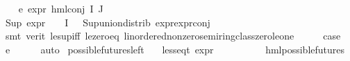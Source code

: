 \begin{isabellebody}
\ \ \isamarkupfalse%
\ e{}{\isacharcolon}{\kern0pt}\ {\isachardoublequoteopen}expr{\isacharunderscore}{\kern0pt}{}\ {\isacharparenleft}{\kern0pt}hml{\isacharunderscore}{\kern0pt}conj\ I\ J\ {\isasymPhi}{\isacharparenright}{\kern0pt}\ {\isasymle}\ {}{\isachardoublequoteclose}\isanewline
\ \ \ \ \isamarkupfalse%
\ {\isacartoucheopen}Sup\ {\isacharparenleft}{\kern0pt}{\isacharparenleft}{\kern0pt}expr{\isacharunderscore}{\kern0pt}{}\ {\isasymcirc}\ {\isasymPhi}{\isacharparenright}{\kern0pt}\ {\isacharbackquote}{\kern0pt}\ I{\isacharparenright}{\kern0pt}\ {\isasymle}\ {}{\isacartoucheclose}\ Sup{\isacharunderscore}{\kern0pt}union{\isacharunderscore}{\kern0pt}distrib\ expr{\isacharunderscore}{\kern0pt}{}{\isachardot}{\kern0pt}expr{\isacharunderscore}{\kern0pt}{}{\isacharunderscore}{\kern0pt}conj\isanewline
\ \ \ \ \isamarkupfalse%
\ {\isacharparenleft}{\kern0pt}smt\ {\isacharparenleft}{\kern0pt}verit{\isacharparenright}{\kern0pt}\ le{\isacharunderscore}{\kern0pt}sup{\isacharunderscore}{\kern0pt}iff\ le{\isacharunderscore}{\kern0pt}zero{\isacharunderscore}{\kern0pt}eq\ linordered{\isacharunderscore}{\kern0pt}nonzero{\isacharunderscore}{\kern0pt}semiring{\isacharunderscore}{\kern0pt}class{\isachardot}{\kern0pt}zero{\isacharunderscore}{\kern0pt}le{\isacharunderscore}{\kern0pt}one{\isacharparenright}{\kern0pt}\isanewline
\ \ \isamarkupfalse%
\ \isamarkupfalse%
\ {\isacharquery}{\kern0pt}case\ \isamarkupfalse%
\ e{}\isanewline
\ \ \ \ \isamarkupfalse%
\ auto\isanewline
{}\isamarkupfalse%
%
\endisatagproof
{\isafoldproof}%
%
\isadelimproof
\isanewline
%
\endisadelimproof
\isanewline
{}\isamarkupfalse%
\ possible{\isacharunderscore}{\kern0pt}futures{\isacharunderscore}{\kern0pt}left{\isacharcolon}{\kern0pt}\isanewline
\ \ \ {\isachardoublequoteopen}less{\isacharunderscore}{\kern0pt}eq{\isacharunderscore}{\kern0pt}t\ {\isacharparenleft}{\kern0pt}expr\ {\isasymphi}{\isacharparenright}{\kern0pt}\ {\isacharparenleft}{\kern0pt}{\isasyminfinity}{\isacharcomma}{\kern0pt}\ {}{\isacharcomma}{\kern0pt}\ {\isasyminfinity}{\isacharcomma}{\kern0pt}\ {\isasyminfinity}{\isacharcomma}{\kern0pt}\ {\isasyminfinity}{\isacharcomma}{\kern0pt}\ {}{\isacharparenright}{\kern0pt}{\isachardoublequoteclose}\isanewline
\ \ \ {\isachardoublequoteopen}hml{\isacharunderscore}{\kern0pt}possible{\isacharunderscore}{\kern0pt}futures\ {\isasymphi}{\isachardoublequoteclose}\isanewline

\end{isabellebody}
